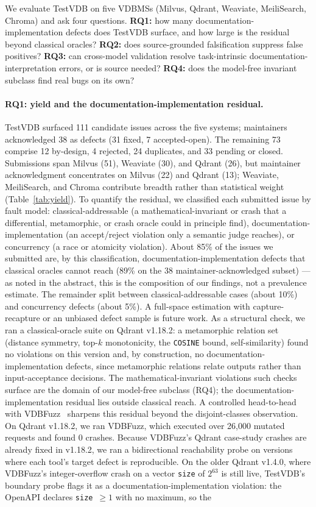\documentclass[sigconf]{acmart}
\begin{document}
We evaluate TestVDB on five VDBMSs (Milvus, Qdrant, Weaviate, MeiliSearch, Chroma) and ask four questions. \textbf{RQ1:} how many documentation-implementation defects does TestVDB surface, and how large is the residual beyond classical oracles? \textbf{RQ2:} does source-grounded falsification suppress false positives? \textbf{RQ3:} can cross-model validation resolve task-intrinsic documentation-interpretation errors, or is source needed? \textbf{RQ4:} does the model-free invariant subclass find real bugs on its own?

\paragraph{RQ1: yield and the documentation-implementation residual.}
TestVDB surfaced 111 candidate issues across the five systems; maintainers acknowledged 38 as defects (31 fixed, 7 accepted-open). The remaining 73 comprise 12 by-design, 4 rejected, 24 duplicates, and 33 pending or closed. Submissions span Milvus (51), Weaviate (30), and Qdrant (26), but maintainer acknowledgment concentrates on Milvus (22) and Qdrant (13); Weaviate, MeiliSearch, and Chroma contribute breadth rather than statistical weight (Table~\ref{tab:yield}). To quantify the residual, we classified each submitted issue by fault model: classical-addressable (a mathematical-invariant or crash that a differential, metamorphic, or crash oracle could in principle find), documentation-implementation (an accept/reject violation only a semantic judge reaches), or concurrency (a race or atomicity violation). About 85\% of the issues we submitted are, by this classification, documentation-implementation defects that classical oracles cannot reach (89\% on the 38 maintainer-acknowledged subset) --- as noted in the abstract, this is the composition of our findings, not a prevalence estimate. The remainder split between classical-addressable cases (about 10\%) and concurrency defects (about 5\%). A full-space estimation with capture-recapture or an unbiased defect sample is future work. As a structural check, we ran a classical-oracle suite on Qdrant v1.18.2: a metamorphic relation set (distance symmetry, top-$k$ monotonicity, the \texttt{COSINE} bound, self-similarity) found no violations on this version and, by construction, no documentation-implementation defects, since metamorphic relations relate outputs rather than input-acceptance decisions. The mathematical-invariant violations such checks surface are the domain of our model-free subclass (RQ4); the documentation-implementation residual lies outside classical reach. A controlled head-to-head with VDBFuzz~\cite{vdbfuzz26} sharpens this residual beyond the disjoint-classes observation. On Qdrant v1.18.2, we ran VDBFuzz, which executed over 26{,}000 mutated requests and found 0 crashes. Because VDBFuzz's Qdrant case-study crashes are already fixed in v1.18.2, we ran a bidirectional reachability probe on versions where each tool's target defect is reproducible. On the older Qdrant v1.4.0, where VDBFuzz's integer-overflow crash on a vector \texttt{size} of $2^{63}$ is still live, TestVDB's boundary probe flags it as a documentation-implementation violation: the OpenAPI declares \texttt{size}~$\geq 1$ with no maximum, so the 
\end{document}
